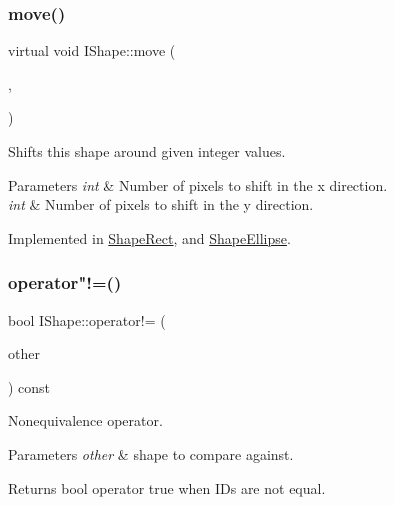 \subsubsection{\texorpdfstring{move()}{move()}}
{\footnotesize\ttfamily virtual void I\+Shape\+::move (\begin{DoxyParamCaption}\item[{int}]{,  }\item[{int}]{ }\end{DoxyParamCaption})\hspace{0.3cm}{\ttfamily [pure virtual]}}



Shifts this shape around given integer values. 


\begin{DoxyParams}{Parameters}
{\em int} & Number of pixels to shift in the x direction. \\
\hline
{\em int} & Number of pixels to shift in the y direction. \\
\hline
\end{DoxyParams}


Implemented in \mbox{\hyperlink{class_shape_rect_a79fcc5998d54d1bfd851646479804b32}{Shape\+Rect}}, and \mbox{\hyperlink{class_shape_ellipse_a07ce6783744d01ccebbd5c2c8b4c7d9b}{Shape\+Ellipse}}.

\mbox{\label{class_i_shape_a1f34ccaa57da81f897bbff476d0ba3ac}} 
\subsubsection{\texorpdfstring{operator"!=()}{operator!=()}}
{\footnotesize\ttfamily bool I\+Shape\+::operator!= (\begin{DoxyParamCaption}\item[{const \mbox{\hyperlink{class_i_shape}{I\+Shape}} \&}]{other }\end{DoxyParamCaption}) const}



Nonequivalence operator. 


\begin{DoxyParams}{Parameters}
{\em other} & shape to compare against. \\
\hline
\end{DoxyParams}
\begin{DoxyReturn}{Returns}
bool operator true when I\+Ds are not equal. 
\end{DoxyReturn}
\mbox{\label{class_i_shape_aea5cdca9613598dbfff8c7d2eb512cea}} 
